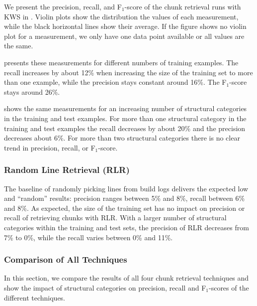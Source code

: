\documentclass[10pt,journal,compsoc]{IEEEtran}
\begin{document}
We present the precision,
recall, and F$_{1}$-score of the chunk retrieval runs with KWS in
.
Violin plots show the distribution the values of each measurement,
while the black horizontal lines show their average.
If the figure shows no violin plot for a measurement, we only have one
data point available or all values are the same.

 presents these
measurements for different
numbers of training examples.
The recall increases by about 12\% when
increasing the size of the training set to more than one example,
while the precision stays constant around 16\%.
The F$_{1}$-score
stays around 26\%.

 shows the same
measurements for an increasing number of structural categories in the
training and test examples.
For more than one structural category in
the training and test examples the recall decreases by about 20\% and
the precision decreases about 6\%.
For more than two structural
categories there is no clear trend in precision, recall, or
F$_{1}$-score.

\subsubsection{Random Line Retrieval (RLR)}
\label{sec:r:rlr}
The baseline of randomly
picking lines from build logs delivers the expected low and
``random'' results: precision ranges between 5\% and 8\%,
recall between 6\% and 8\%.
As expected, the size of the training set has no impact on precision
or recall of retrieving chunks with RLR.
With a larger number of structural categories within the training and
test sets, the precision of RLR decreases from 7\% to 0\%, while
the recall varies between 0\% and 11\%.

\subsubsection{Comparison of All Techniques}
In this section, we compare the results of all four chunk retrieval
techniques and show the impact of structural categories on precision,
recall and F$_{1}$-scores of the different techniques.
\end{document}
